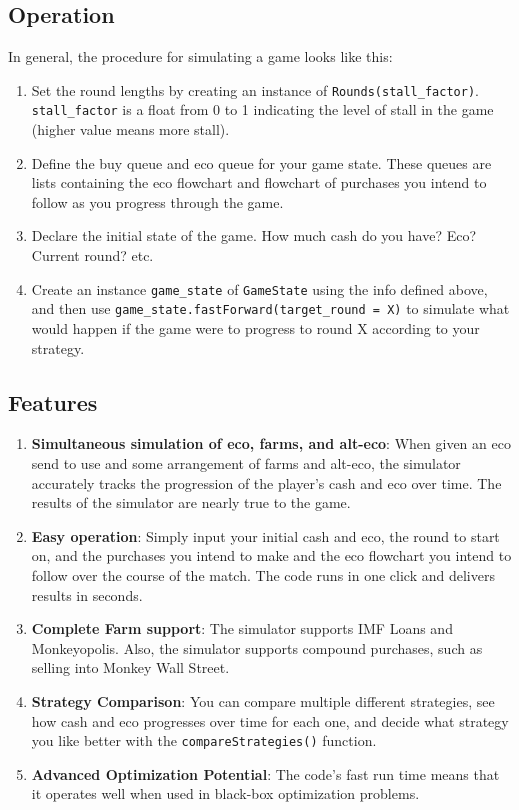 \documentclass[12pt,letterpaper]{article}
\theoremstyle{remark}
\theoremstyle{plain}
\begin{document}
\subsection{Operation}

In general, the procedure for simulating a game looks like this:

\begin{enumerate}
    \item Set the round lengths by creating an instance of \texttt{Rounds(stall\_factor)}. \texttt{stall\_factor} is a float from 0 to 1 indicating the level of stall in the game (higher value means more stall).
    \item Define the buy queue and eco queue for your game state. These queues are lists containing the eco flowchart and flowchart of purchases you intend to follow as you progress through the game.
    \item Declare the initial state of the game. How much cash do you have? Eco? Current round? etc.
    \item Create an instance \texttt{game\_state} of \texttt{GameState} using the info defined above, and then use \texttt{game\_state.fastForward(target\_round = X)} to simulate what would happen if the game were to progress to round X according to your strategy.
\end{enumerate}

\subsection{Features}

\begin{enumerate}
	\item \textbf{Simultaneous simulation of eco, farms, and alt-eco}: When given an eco send to use and some arrangement of farms and alt-eco, the simulator accurately tracks the progression of the player's cash and eco over time. The results of the simulator are nearly true to the game.
	\item \textbf{Easy operation}: Simply input your initial cash and eco, the round to start on, and the purchases you intend to make and the eco flowchart you intend to follow over the course of the match. The code runs in one click and delivers results in seconds.
	\item \textbf{Complete Farm support}: The simulator supports IMF Loans and Monkeyopolis. Also, the simulator supports compound purchases, such as selling into Monkey Wall Street.
	\item \textbf{Strategy Comparison}: You can compare multiple different strategies, see how cash and eco progresses over time for each one, and decide what strategy you like better with the \texttt{compareStrategies()} function.
	\item \textbf{Advanced Optimization Potential}: The code's fast run time means that it operates well when used in black-box optimization problems.
\end{enumerate}
\end{document}
